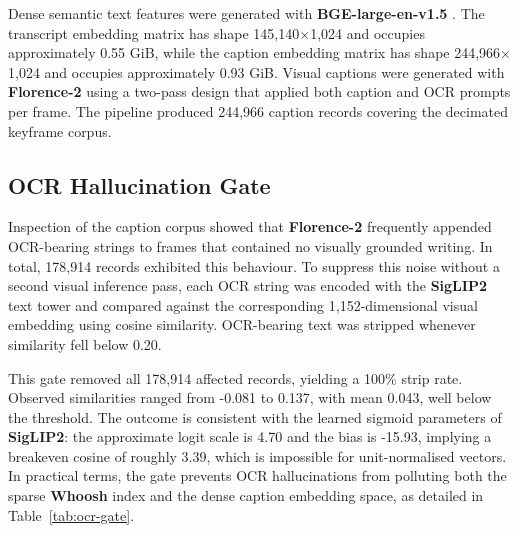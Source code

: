 Dense semantic text features were generated with \textbf{BGE-large-en-v1.5} \cite{chen2024bge}. The transcript embedding matrix has shape 145,140$\times$1,024 and occupies approximately 0.55 GiB, while the caption embedding matrix has shape 244,966$\times$1,024 and occupies approximately 0.93 GiB. Visual captions were generated with \textbf{Florence-2} \cite{xiao2023florence2} using a two-pass design that applied both caption and OCR prompts per frame. The pipeline produced 244,966 caption records covering the decimated keyframe corpus.

\subsection{OCR Hallucination Gate}
\label{sec:ocr-gate}

Inspection of the caption corpus showed that \textbf{Florence-2} frequently appended OCR-bearing strings to frames that contained no visually grounded writing. In total, 178,914 records exhibited this behaviour. To suppress this noise without a second visual inference pass, each OCR string was encoded with the \textbf{SigLIP2} text tower and compared against the corresponding 1,152-dimensional visual embedding using cosine similarity. OCR-bearing text was stripped whenever similarity fell below 0.20.

This gate removed all 178,914 affected records, yielding a 100\% strip rate. Observed similarities ranged from -0.081 to 0.137, with mean 0.043, well below the threshold. The outcome is consistent with the learned sigmoid parameters of \textbf{SigLIP2}: the approximate logit scale is 4.70 and the bias is -15.93, implying a breakeven cosine of roughly 3.39, which is impossible for unit-normalised vectors. In practical terms, the gate prevents OCR hallucinations from polluting both the sparse \textbf{Whoosh} index and the dense caption embedding space, as detailed in Table~\ref{tab:ocr-gate}.

